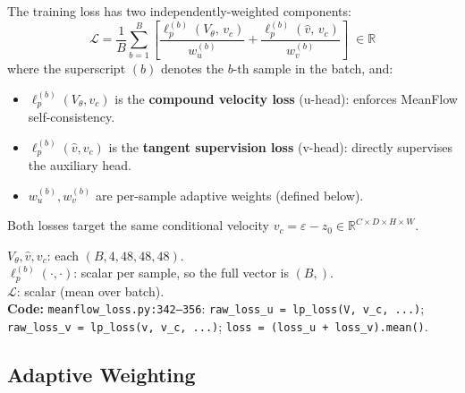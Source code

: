 \documentclass[11pt,a4paper]{article}
\newcommand{\code}[1]{\texttt{#1}}
\begin{document}
The training loss has two independently-weighted components:
\begin{equation}
  \boxed{
  \mathcal{L}
    = \frac{1}{B}\sum_{b=1}^{B}\!\left[
        \frac{\ell_p^{(b)}(V_\theta,\,v_c)}{w_u^{(b)}}
        + \frac{\ell_p^{(b)}(\hat{v},\,v_c)}{w_v^{(b)}}
      \right]
  }
  \;\in \mathbb{R}
  \label{eq:total_loss}
\end{equation}
where the superscript $(b)$ denotes the $b$-th sample in the batch, and:
\begin{itemize}[nosep]
  \item $\ell_p^{(b)}(V_\theta, v_c)$ is the \textbf{compound velocity loss}
    (u-head): enforces MeanFlow self-consistency.
  \item $\ell_p^{(b)}(\hat{v}, v_c)$ is the \textbf{tangent supervision loss}
    (v-head): directly supervises the auxiliary head.
  \item $w_u^{(b)}, w_v^{(b)}$ are per-sample adaptive weights (defined below).
\end{itemize}
Both losses target the same conditional velocity $v_c = \varepsilon - z_0
\in \mathbb{R}^{C \times D \times H \times W}$.
\begin{shapes}
$V_\theta, \hat{v}, v_c$: each $(B, 4, 48, 48, 48)$.\\
$\ell_p^{(b)}(\cdot, \cdot)$: scalar per sample, so the full vector is $(B,)$.\\
$\mathcal{L}$: scalar (mean over batch).\\
\textbf{Code:} \code{meanflow\_loss.py:342--356}:
\code{raw\_loss\_u = lp\_loss(V, v\_c, ...)};
\code{raw\_loss\_v = lp\_loss(v, v\_c, ...)};
\code{loss = (loss\_u + loss\_v).mean()}.
\end{shapes}

\subsection{Adaptive Weighting}
\label{sec:adaptive}
\end{document}
